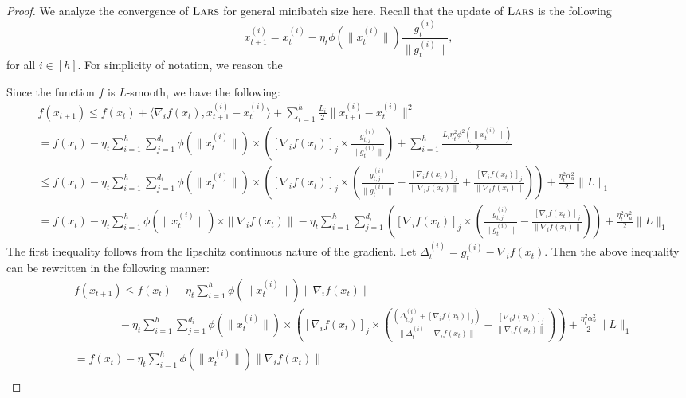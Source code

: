 \documentclass{article} \usepackage{iclr2020_conference,times}
\newcommand{\lars}{\textsc{Lars}}
\begin{document}
\begin{proof}
We analyze the convergence of $\lars$ for general minibatch size here. Recall that the update of $\lars$  is the following
$$
x_{t+1}^{(i)}  = x_{t}^{(i)} - \eta_t \phi(\|x_t^{(i)}\|) \frac{g_{t}^{(i)}}{\|g_t^{(i)}\|},
$$
for all $i \in [h]$. For simplicity of notation, we reason the 

Since the function $f$ is $L$-smooth, we have the following:
\begin{align}
&f(x_{t+1}) \leq f(x_t) + \langle \nabla_i f(x_t), x_{t+1}^{(i)} - x_{t}^{(i)} \rangle + \sum_{i=1}^h \frac{L_i}{2} \|x_{t+1}^{(i)} - x_t^{(i)}\|^2 \nonumber \\
&= f(x_t) - \eta_t \sum_{i=1}^h \sum_{j=1}^{d_i}\phi(\|x_t^{(i)}\|)  \times \left( [\nabla_i f(x_t)]_j \times \frac{g_{t,j}^{(i)}}{\|g_{t}^{(i)}\|}  \right) + \sum_{i=1}^h \frac{L_i\eta_t^2 \phi^2(\|x_t^{(i)}\|)}{2} \nonumber \\
&\leq f(x_t) - \eta_t \sum_{i=1}^h \sum_{j=1}^{d_i}   \phi(\|x_t^{(i)}\|) \times \left( [\nabla_i f(x_t)]_j \times \left(\frac{g_{t,j}^{(i)}}{\|g_{t}^{(i)}\|} - \frac{[\nabla_i f(x_t)]_j}{\| \nabla_i f(x_t) \|} + \frac{[\nabla_i f(x_t)]_j}{\| \nabla_i f(x_t) \|} \right)  \right) + \frac{\eta_t^2  \alpha_u^2}{2} \| L\|_1 \nonumber \\
&= f(x_t) - \eta_t\sum_{i=1}^h  \phi(\|x_t^{(i)}\|) \times \|\nabla_i f(x_t)\| - \eta_t  \sum_{i=1}^h \sum_{j=1}^{d_i} \left( [\nabla_i f(x_t)]_j \times \left(\frac{g_{t,j}^{(i)}}{\|g_{t}^{(i)}\|} - \frac{[\nabla_i f(x_t)]_j}{\| \nabla_i f(x_t) \|} \right)  \right) + \frac{\eta_t^2 \alpha_u^2 }{2} \| L\|_1
\label{eq:lars-conv-eq1}
\end{align}
The first inequality follows from the lipschitz continuous nature of the gradient. Let $\Delta_{t}^{(i)} = g_{t}^{(i)} - \nabla_i f(x_t)$. Then the above inequality can be rewritten in the following manner:
\begin{align}
&f(x_{t+1}) \leq f(x_t) - \eta_t \sum_{i=1}^h \phi(\|x_t^{(i)}\|)  \|\nabla_i f(x_t)\| \nonumber \\
& \qquad \qquad - \eta_t  \sum_{i=1}^h \sum_{j=1}^{d_i} \phi(\|x_t^{(i)}\|) \times  \left( [\nabla_i f(x_t)]_j \times \left(\frac{(\Delta_{t,j}^{(i)} + [\nabla_i f(x_t)]_j)}{\|\Delta_{t}^{(i)} + \nabla_i f(x_t)\|} - \frac{[\nabla_i f(x_t)]_j}{\| \nabla_i f(x_t) \|} \right)  \right) + \frac{\eta_t^2 \alpha_u^2}{2} \| L\|_1 \nonumber \\
&= f(x_t) - \eta_t \sum_{i=1}^h \phi(\|x_t^{(i)}\|) \|\nabla_i f(x_t)\| \nonumber \\

\end{align}
\end{proof}
\end{document}
